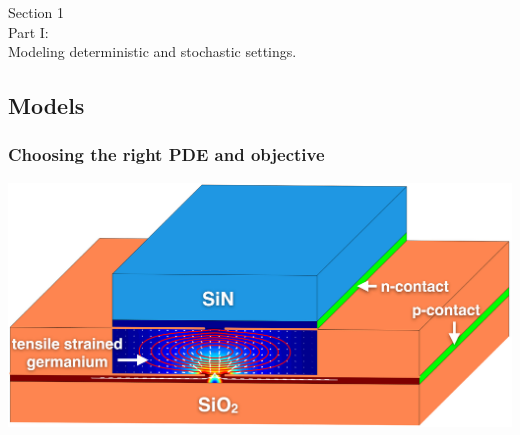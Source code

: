 \documentclass[aspectratio=169,xcolor=dvipsnames,10pt]{beamer}
\begin{document}






\begin{frame}\frametitle{}
\begin{center}\Large
Section 1\\
Part I:\\
Modeling deterministic and stochastic settings.
\end{center}
\end{frame}


\subsection{Models}
\begin{frame}\frametitle{Choosing the right PDE and objective}

\begin{example}
\centering
      \includegraphics[width=0.6\linewidth]{Part I/figures/graphical_abstract_ieee.jpeg}
\end{example}
\end{frame}
\end{document}
